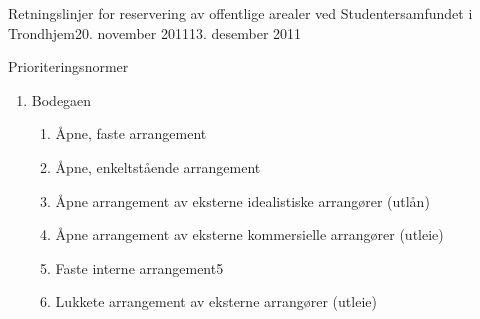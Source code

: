\documentclass[fsbok.tex]{subfiles}
\begin{document}
\begin{instruks}{Retningslinjer for reservering av offentlige arealer
    ved Studentersamfundet i Trondhjem}{20. november 2011}{13. desember 2011}
\begin{instruksledd}{Prioriteringsnormer}
\begin{enumerate}
\begin{enumerate}
                        \begin{enumerate}
                            \item Åpne, faste arrangementer/Studentersamfundets
                                Symfoniorchester
                            \item Fotballkamper på landskampnivå
                            \item Konserter
                            \item Andre åpne, enkeltstående arrangement
                            \item SIT-forestilling med tre generalprøvedager
                            \item Åpne arrangementer av Samfundets kunstneriske
                                gjenger
                            \item Andre øvinger
                            \item Åpne arrangementer av eksterne idealistiske
                                arrangører (utlån)
                            \item Faste interne arrangement4
                            \item Åpne arrangementer av eksterne kommersielle
                                arrangører (utleie)
                            \item Lukkete arrangement av eksterne arrangører
                                (utleie)
                            \item Interne fester
                        \end{enumerate}
                        4 For eksempel Samfundets Interne Grand Prix
                    \item Bodegaen
                        \begin{enumerate}
                            \item Åpne, faste arrangement
                            \item Åpne, enkeltstående arrangement
                            \item Åpne arrangement av eksterne idealistiske
                                arrangører (utlån)
                            \item Åpne arrangement av eksterne kommersielle
                                arrangører (utleie)
                            \item Faste interne arrangement5
                            \item Lukkete arrangement av eksterne arrangører (utleie)

\end{enumerate}
\end{enumerate}
\end{enumerate}
\end{instruksledd}
\end{instruks}
\end{document}
